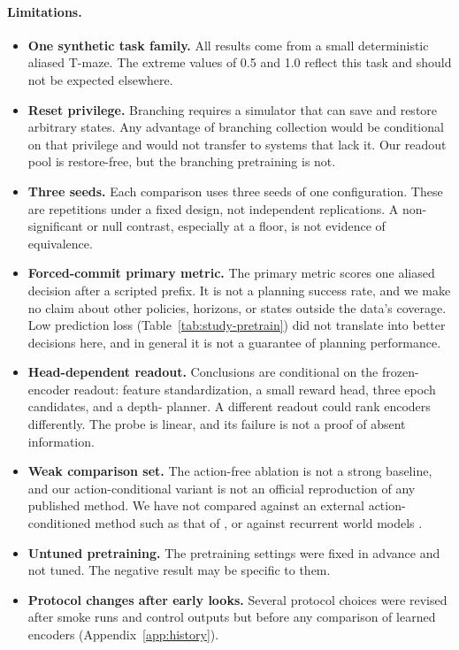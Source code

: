 \paragraph{Limitations.}
\begin{itemize}
  \item \textbf{One synthetic task family.} All results come from a small deterministic aliased T-maze. The extreme values of 0.5 and 1.0 reflect this task and should not be expected elsewhere.
  \item \textbf{Reset privilege.} Branching requires a simulator that can save and restore arbitrary states. Any advantage of branching collection would be conditional on that privilege and would not transfer to systems that lack it. Our readout pool is restore-free, but the branching pretraining is not.
  \item \textbf{Three seeds.} Each comparison uses three seeds of one configuration. These are repetitions under a fixed design, not independent replications. A non-significant or null contrast, especially at a floor, is not evidence of equivalence.
  \item \textbf{Forced-commit primary metric.} The primary metric scores one aliased decision after a scripted prefix. It is not a planning success rate, and we make no claim about other policies, horizons, or states outside the data's coverage. Low prediction loss (Table~\ref{tab:study-pretrain}) did not translate into better decisions here, and in general it is not a guarantee of planning performance.
  \item \textbf{Head-dependent readout.} Conclusions are conditional on the frozen-encoder readout: feature standardization, a small reward head, three epoch candidates, and a depth-\DiagCfgPlanHorizon{} planner. A different readout could rank encoders differently. The probe is linear, and its failure is not a proof of absent information.
  \item \textbf{Weak comparison set.} The action-free ablation is not a strong baseline, and our action-conditional variant is not an official reproduction of any published method. We have not compared against an external action-conditioned method such as that of \citet{kwon2024future}, or against recurrent world models \citep{hafner2023dreamerv3,samsami2024r2i}.
  \item \textbf{Untuned pretraining.} The pretraining settings were fixed in advance and not tuned. The negative result may be specific to them.
  \item \textbf{Protocol changes after early looks.} Several protocol choices were revised after smoke runs and control outputs but before any comparison of learned encoders (Appendix~\ref{app:history}).
\end{itemize}
